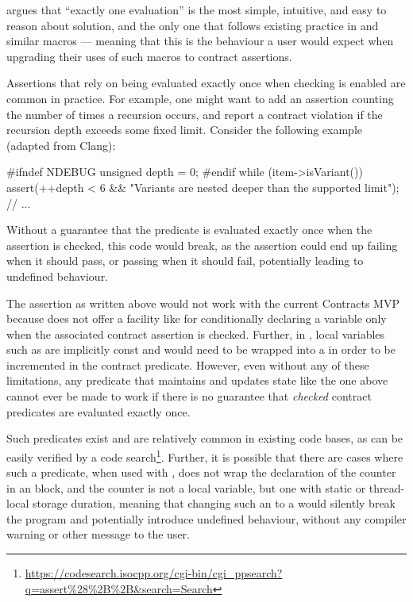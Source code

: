 \cite{P2756R0} argues that ``exactly one evaluation'' is the most simple, intuitive, and easy to reason about solution, and the only one that follows existing practice in  and similar macros --- meaning that this is the behaviour a user would expect when upgrading their uses of such macros to \cite{P2900R6} contract assertions.

Assertions that rely on being evaluated exactly once when checking is enabled are common in practice. For example, one might want to add an assertion counting the number of times a recursion occurs, and report a contract violation if the recursion depth exceeds some fixed limit. Consider the following example (adapted from Clang):
\begin{codeblock}
#ifndef NDEBUG
  unsigned depth = 0;
#endif
  while (item->isVariant()) {
    assert(++depth < 6 && "Variants are nested deeper than the supported limit");
    // ...
  }
\end{codeblock}
Without a guarantee that the predicate is evaluated exactly once when the assertion is checked, this code would break, as the assertion could end up failing when it should pass, or passing when it should fail, potentially leading to undefined behaviour.

The assertion as written above would not work with the current Contracts MVP because \cite{P2900R6} does not offer a facility like  for conditionally declaring a variable only when the associated contract assertion is checked. Further, in \cite{P2900R6}, local variables such as  are implicitly const and would need to be wrapped into a  in order to be incremented in the contract predicate. However, even without any of these limitations, any predicate that maintains and updates state like the one above cannot ever be made to work if there is no guarantee that \emph{checked} contract predicates are evaluated exactly once. 

Such predicates exist and are relatively common in existing code bases, as can be easily verified by a code search\footnote{\url{https://codesearch.isocpp.org/cgi-bin/cgi_ppsearch?q=assert\%28\%2B\%2B&search=Search}}. Further, it is possible that there are cases where such a predicate, when used with , does not wrap the declaration of the counter in an  block, and the counter is not a local variable, but one with static or thread-local storage duration, meaning that changing such an  to a  would silently break the program and potentially introduce undefined behaviour, without any compiler warning or other message to the user.

